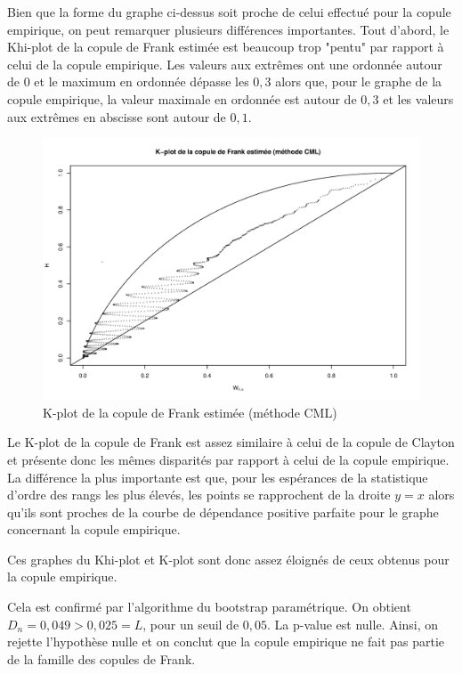 Bien que la forme du graphe ci-dessus soit proche de celui effectué pour la copule empirique, on peut remarquer plusieurs différences importantes. Tout d'abord, le Khi-plot de la copule de Frank estimée est beaucoup trop "pentu" par rapport à celui de la copule empirique. Les valeurs aux extrêmes ont une ordonnée autour de $0$ et le maximum en ordonnée dépasse les $0,3$ alors que, pour le graphe de la copule empirique, la valeur maximale en ordonnée est autour de $0,3$ et les valeurs aux extrêmes en abscisse sont autour de $0,1$.

\noindent%
\begin{figure}[H]
    \begin{center}
      \includegraphics[width=17 cm, angle=0]{./pictures/frankcmlkplot.png}
      \centering\caption{\label{2}K-plot de la copule de Frank estimée (méthode CML)}
    \end{center}
\end{figure}

Le K-plot de la copule de Frank est assez similaire à celui de la copule de Clayton et présente donc les mêmes disparités par rapport à celui de la copule empirique. La différence la plus importante est que, pour les espérances de la statistique d'ordre des rangs les plus élevés, les points se rapprochent de la droite $y=x$ alors qu'ils sont proches de la courbe de dépendance positive parfaite pour le graphe concernant la copule empirique.

Ces graphes du Khi-plot et K-plot sont donc assez éloignés de ceux obtenus pour la copule empirique.

Cela est confirmé par l'algorithme du bootstrap paramétrique. On obtient $D_n = 0,049 > 0,025 = L$, pour un seuil de $0,05$. La p-value est nulle. Ainsi, on rejette l'hypothèse nulle et on conclut que la copule empirique ne fait pas partie de la famille des copules de Frank.

